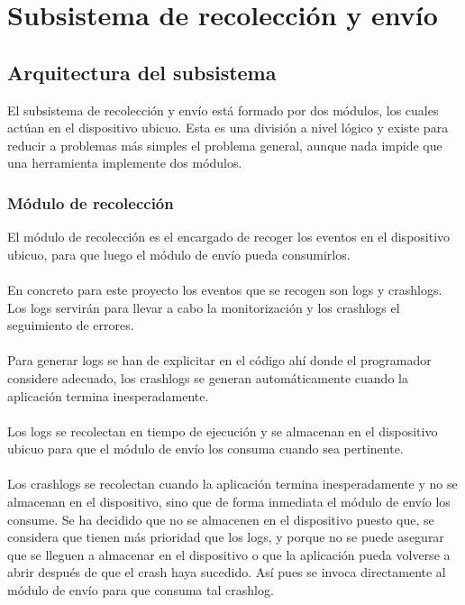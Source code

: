 \chapter{Subsistema de recolección y envío}

\section{Arquitectura del subsistema}
El subsistema de recolección y envío está formado por dos módulos, los cuales actúan en el dispositivo ubicuo. Esta es una división a nivel lógico y existe para reducir a problemas más simples el problema general, aunque nada impide que una herramienta implemente dos módulos.


\subsection{Módulo de recolección}
El módulo de recolección es el encargado de recoger los eventos en el dispositivo ubicuo, para que luego el módulo de envío pueda consumirlos. 
\\\\
En concreto para este proyecto los eventos que se recogen son logs y crashlogs. Los logs servirán para llevar a cabo la monitorización y los crashlogs el seguimiento de errores.
\\\\
Para generar logs se han de explicitar en el código ahí donde el programador considere adecuado, los crashlogs se generan automáticamente cuando la aplicación termina inesperadamente.
\\\\
Los logs se recolectan en tiempo de ejecución y se almacenan en el dispositivo ubicuo para que el módulo de envío los consuma cuando sea pertinente.
\\\\
Los crashlogs se recolectan cuando la aplicación termina inesperadamente y no se almacenan en el dispositivo, sino que de forma inmediata el módulo de envío los consume. Se ha decidido que no se almacenen en el dispositivo puesto que, se considera que tienen más prioridad que los logs, y porque no se puede asegurar que se lleguen a almacenar en el dispositivo o que la aplicación pueda volverse a abrir después de que el crash haya sucedido. Así pues se invoca directamente al módulo de envío para que consuma tal crashlog.

